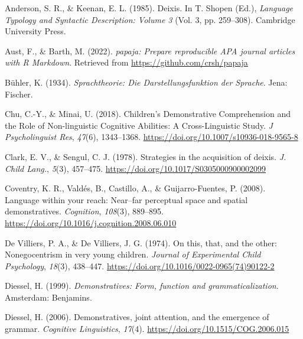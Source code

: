 \documentclass[
  man,floatsintext]{apa6}
\newlength{\cslhangindent}
\newenvironment{CSLReferences}[2] %
 {\begin{list}{}{%
  \setlength{\itemindent}{0pt}
  \setlength{\leftmargin}{0pt}
  \setlength{\parsep}{0pt}
  \ifodd #1
   \setlength{\leftmargin}{\cslhangindent}
   \setlength{\itemindent}{-1\cslhangindent}
  \fi
  \setlength{\itemsep}{#2\baselineskip}}}
 {\end{list}}
\begin{document}
\label{refs}
\begin{CSLReferences}{1}{0}
Anderson, S. R., \& Keenan, E. L. (1985). Deixis. In T. Shopen (Ed.), \emph{Language {Typology} and {Syntactic} {Description}: {Volume} 3} (Vol. 3, pp. 259--308). Cambridge University Press.

Aust, F., \& Barth, M. (2022). \emph{{papaja}: {Prepare} reproducible {APA} journal articles with {R Markdown}}. Retrieved from \url{https://github.com/crsh/papaja}

Bühler, K. (1934). \emph{Sprachtheorie: {Die} {Darstellungsfunktion} der {Sprache}}. Jena: Fischer.

Chu, C.-Y., \& Minai, U. (2018). Children's {Demonstrative} {Comprehension} and the {Role} of {Non}-linguistic {Cognitive} {Abilities}: {A} {Cross}-{Linguistic} {Study}. \emph{J Psycholinguist Res}, \emph{47}(6), 1343--1368. \url{https://doi.org/10.1007/s10936-018-9565-8}

Clark, E. V., \& Sengul, C. J. (1978). Strategies in the acquisition of deixis. \emph{J. Child Lang.}, \emph{5}(3), 457--475. \url{https://doi.org/10.1017/S0305000900002099}

Coventry, K. R., Valdés, B., Castillo, A., \& Guijarro-Fuentes, P. (2008). Language within your reach: {Near}--far perceptual space and spatial demonstratives. \emph{Cognition}, \emph{108}(3), 889--895. \url{https://doi.org/10.1016/j.cognition.2008.06.010}

De Villiers, P. A., \& De Villiers, J. G. (1974). On this, that, and the other: {Nonegocentrism} in very young children. \emph{Journal of Experimental Child Psychology}, \emph{18}(3), 438--447. \url{https://doi.org/10.1016/0022-0965(74)90122-2}

Diessel, H. (1999). \emph{Demonstratives: Form, function and grammaticalization}. Amsterdam: Benjamins.

Diessel, H. (2006). Demonstratives, joint attention, and the emergence of grammar. \emph{Cognitive Linguistics}, \emph{17}(4). \url{https://doi.org/10.1515/COG.2006.015}


\end{CSLReferences}
\end{document}
